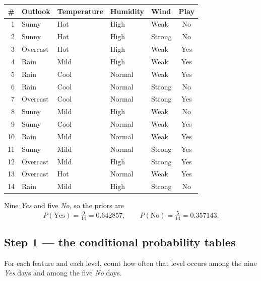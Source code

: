 \documentclass[11pt]{article}
\begin{document}
\begin{center}\small
\begin{tabular}{@{}rllllc@{}}
\toprule
\# & Outlook & Temperature & Humidity & Wind & \textbf{Play}\\
\midrule
1 & Sunny & Hot & High & Weak & No\\
2 & Sunny & Hot & High & Strong & No\\
3 & Overcast & Hot & High & Weak & Yes\\
4 & Rain & Mild & High & Weak & Yes\\
5 & Rain & Cool & Normal & Weak & Yes\\
6 & Rain & Cool & Normal & Strong & No\\
7 & Overcast & Cool & Normal & Strong & Yes\\
8 & Sunny & Mild & High & Weak & No\\
9 & Sunny & Cool & Normal & Weak & Yes\\
10 & Rain & Mild & Normal & Weak & Yes\\
11 & Sunny & Mild & Normal & Strong & Yes\\
12 & Overcast & Mild & High & Strong & Yes\\
13 & Overcast & Hot & Normal & Weak & Yes\\
14 & Rain & Mild & High & Strong & No\\
\bottomrule
\end{tabular}
\end{center}

Nine \emph{Yes} and five \emph{No}, so the priors are
\[
  P(\text{Yes}) = \tfrac{9}{14} = 0.642857, \qquad
  P(\text{No})  = \tfrac{5}{14} = 0.357143.
\]

\subsection{Step 1 --- the conditional probability tables}

For each feature and each level, count how often that level occurs among the
nine \emph{Yes} days and among the five \emph{No} days.
\end{document}
